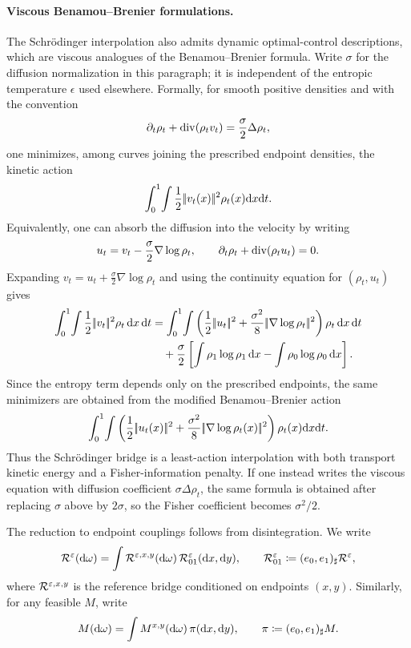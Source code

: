 \paragraph{Viscous Benamou--Brenier formulations.}
The Schr\"odinger interpolation also admits dynamic optimal-control descriptions, which are viscous analogues of the Benamou--Brenier formula. Write $\sigma$ for the diffusion normalization in this paragraph; it is independent of the entropic temperature $\epsilon$ used elsewhere. Formally, for smooth positive densities and with the convention
\[
	\partial_t\rho_t+\operatorname{div}(\rho_t v_t)
	=
	\frac{\sigma}{2}\Delta\rho_t,
\]
one minimizes, among curves joining the prescribed endpoint densities, the kinetic action
\[
	\int_0^1\!\int
	\frac12|\!| v_t(x) |\!|^2\rho_t(x)\mathrm{d} x\mathrm{d} t .
\]
Equivalently, one can absorb the diffusion into the velocity by writing
\[
	u_t=v_t-\frac{\sigma}{2}\nabla\log\rho_t,
	\qquad
	\partial_t\rho_t+\operatorname{div}(\rho_t u_t)=0.
\]
Expanding $v_t=u_t+\frac{\sigma}{2}\nabla\log\rho_t$ and using the continuity equation for $(\rho_t,u_t)$ gives
	\begin{align*}
		\int_0^1\!\int
		\frac12\norm{v_t}^2\rho_t\,\d x\,\d t
		&=
		\int_0^1\!\int
		\left(
			\frac12\norm{u_t}^2
		+
		\frac{\sigma^2}{8}\norm{\nabla\log\rho_t}^2
	\right)\rho_t\,\d x\,\d t
		\\
		&\quad+
		\frac{\sigma}{2}
		\left[
			\int\rho_1\log\rho_1\,\d x
		-
			\int\rho_0\log\rho_0\,\d x
		\right].
	\end{align*}
Since the entropy term depends only on the prescribed endpoints, the same minimizers are obtained from the modified Benamou--Brenier action
\[
	\int_0^1\!\int
	\left(
		\frac12|\!| u_t(x) |\!|^2
		+
		\frac{\sigma^2}{8}|\!| \nabla\log\rho_t(x) |\!|^2
	\right)
	\rho_t(x)\mathrm{d} x\mathrm{d} t .
\]
Thus the Schr\"odinger bridge is a least-action interpolation with both transport kinetic energy and a Fisher-information penalty. If one instead writes the viscous equation with diffusion coefficient $\sigma\Delta\rho_t$, the same formula is obtained after replacing $\sigma$ above by $2\sigma$, so the Fisher coefficient becomes $\sigma^2/2$.

The reduction to endpoint couplings follows from disintegration. We write
\[
	\mathcal{R}^\varepsilon(\mathrm{d}\omega)
	=
	\int \mathcal{R}^{\varepsilon,x,y}(\mathrm{d}\omega)\,
		\mathcal{R}^\varepsilon_{01}(\mathrm{d} x,\mathrm{d} y),
	\qquad
	\mathcal{R}^\varepsilon_{01}\coloneqq(e_0,e_1)_\sharp\mathcal{R}^\varepsilon,
\]
where $\mathcal{R}^{\varepsilon,x,y}$ is the reference bridge conditioned on endpoints $(x,y)$. Similarly, for any feasible $M$, write
\[
	M(\mathrm{d}\omega)
	=
	\int M^{x,y}(\mathrm{d}\omega)\,\pi(\mathrm{d} x,\mathrm{d} y),
	\qquad
	\pi\coloneqq(e_0,e_1)_\sharp M.
\]

